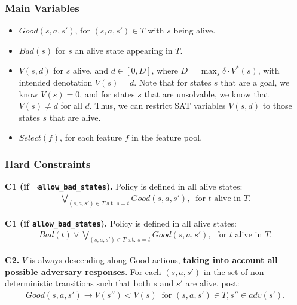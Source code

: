 \documentclass[a4paper]{article}
\newcommand{\smallpar}[1]{{\vspace{10pt}\noindent \bf #1.}}
\newcommand{\badtx}{\ensuremath{\mathrm{BAD}}}
\begin{document}
\subsubsection{Main Variables}

\begin{itemize}
 \item $Good(s, a, s')$, for $(s, a, s') \in T$ with $s$ being alive.

 \item $Bad(s)$ for $s$ an alive state appearing in $T$.


 \item $V(s, d)$ for $s$ alive, and $d \in [0, D]$, where $D = \max_{s} \delta \cdot V^*(s)$,
 with intended denotation $V(s)=d$.
 Note that for states $s$ that are a goal, we know $V(s)=0$,
 and for states $s$ that are unsolvable, we know that $V(s) \neq d$ for all $d$.
 Thus, we can restrict SAT variables $V(s, d)$ to those states $s$ that are alive.

 \item $Select(f)$, for each feature $f$ in the feature pool.
\end{itemize}



\subsubsection{Hard Constraints}

\smallpar{C1 (if $\neg$\texttt{allow\_bad\_states})}
Policy is defined in all alive states:
\begin{align*}
\bigvee_{(s, a, s') \in T \text{ s.t. } s=t} Good(s, a, s'), \;\; \text{for $t$ alive in $T$.}
\end{align*}

\smallpar{C1 (if \texttt{allow\_bad\_states})}
Policy is defined in all alive states:
\begin{align*}
Bad(t) \lor \bigvee_{(s, a, s') \in T \text{ s.t. } s=t} Good(s, a, s'), \;\; \text{for $t$ alive in $T$.}
\end{align*}

\smallpar{C2} $V$ is always descending along Good actions, \textbf{taking into account all possible adversary responses}.
For each $(s, a, s')$ in the set of non-deterministic transitions
such that both $s$ and $s'$ are alive, post:
\begin{align*}
Good(s, a, s') \rightarrow V(s'') < V(s)  \;\; \text{for } (s, a, s') \in T,  s'' \in adv(s').
\end{align*}
\end{document}
